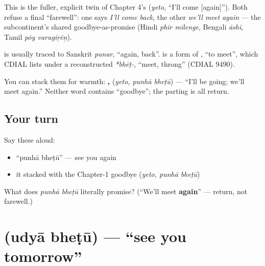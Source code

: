 This is the fuller, explicit twin of Chapter 4's \textbf{} (\emph{yeto}, \textquotedblleft{}I'll come {[}again{]}\textquotedblright{}). Both refuse a final \textquotedblleft{}farewell\textquotedblright{}: one says \emph{I'll come back}, the other \emph{we'll meet again} — the subcontinent's shared goodbye-as-promise (Hindi \emph{phir milenge}, Bengali \emph{āshi}, Tamil \emph{pōy varugiṟēṉ}).

\begin{cousinweb}
\textbf{} is usually traced to Sanskrit \emph{punar}, \textquotedblleft{}again, back\textquotedblright{}. \textbf{} is a form of \textbf{}, \textquotedblleft{}to meet\textquotedblright{}, which CDIAL lists under a reconstructed \emph{*bhēṭ-}, \textquotedblleft{}meet, throng\textquotedblright{} (CDIAL 9490).
\end{cousinweb}

\begin{culture}
You can stack them for warmth: \textbf{,  } (\emph{yeto, punhā bheṭū}) — \textquotedblleft{}I'll be going; we'll meet again.\textquotedblright{} Neither word contains \textquotedblleft{}goodbye\textquotedblright{}; the parting is all return.
\end{culture}

\subsection*{Your turn}
Say these aloud:

\begin{itemize}
\raggedright
  \item \textquotedblleft{}punhā bheṭū\textquotedblright{} — see you again
  \item it stacked with the Chapter-1 goodbye (\emph{yeto, punhā bheṭū})
\end{itemize}

\begin{tcolorbox}[breakable,colback=teal!4,colframe=teal!35!black,title={Before you move on}]
What does \emph{punhā bheṭū} literally promise? (\textquotedblleft{}We'll meet \textbf{again}\textquotedblright{} — return, not farewell.)
\end{tcolorbox}
\section[\texorpdfstring{\mr{उद्या} \mr{भेटू} (udyā bheṭū)}{उद्या भेटू (udyā bheṭū)}]{  (udyā bheṭū) — \textquotedblleft{}see you tomorrow\textquotedblright{}}

